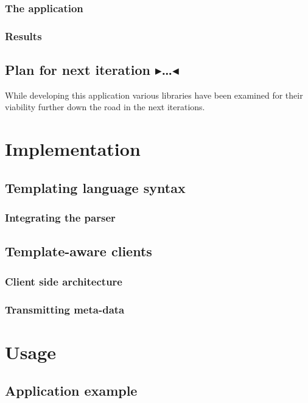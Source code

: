 \documentclass[twoside,11pt,openright]{report}
\newcommand{\todo}[1]{{\color[rgb]{.5,0,0}\textbf{$\blacktriangleright$#1$\blacktriangleleft$}}}
\begin{document}
\subsection{The application}
\subsection{Results}
\section{Plan for next iteration \todo{\dots}}
While developing this application various libraries have been examined for
their viability further down the road  in the next iterations.


\chapter{Implementation}
\section{Templating language syntax}
\subsection{Integrating the parser}
\section{Template-aware clients}
\subsection{Client side architecture}
\subsection{Transmitting meta-data}


\chapter{Usage}
\section{Application example}

\end{document}
